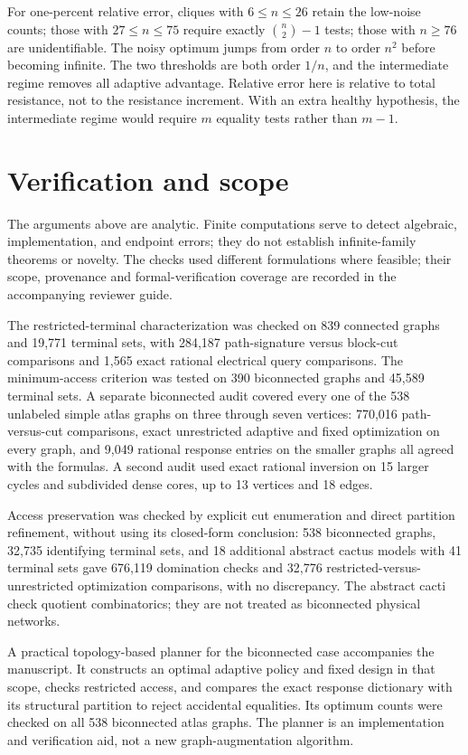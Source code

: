 \documentclass[11pt,letterpaper]{article}
\begin{document}
For one-percent relative error, cliques with $6\le n\le26$ retain the low-noise counts; those with $27\le n\le75$ require exactly $\binom n2-1$ tests; those with $n\ge76$ are unidentifiable. The noisy optimum jumps from order $n$ to order $n^2$ before becoming infinite. The two thresholds are both order $1/n$, and the intermediate regime removes all adaptive advantage. Relative error here is relative to total resistance, not to the resistance increment. With an extra healthy hypothesis, the intermediate regime would require $m$ equality tests rather than $m-1$.

\section{Verification and scope}\label{sec:verification}
The arguments above are analytic. Finite computations serve to detect algebraic, implementation, and endpoint errors; they do not establish infinite-family theorems or novelty. The checks used different formulations where feasible; their scope, provenance and formal-verification coverage are recorded in the accompanying reviewer guide.

The restricted-terminal characterization was checked on 839 connected graphs and 19,771 terminal sets, with 284,187 path-signature versus block-cut comparisons and 1,565 exact rational electrical query comparisons. The minimum-access criterion was tested on 390 biconnected graphs and 45,589 terminal sets. A separate biconnected audit covered every one of the 538 unlabeled simple atlas graphs on three through seven vertices: 770,016 path-versus-cut comparisons, exact unrestricted adaptive and fixed optimization on every graph, and 9,049 rational response entries on the smaller graphs all agreed with the formulas. A second audit used exact rational inversion on 15 larger cycles and subdivided dense cores, up to 13 vertices and 18 edges.

Access preservation was checked by explicit cut enumeration and direct partition refinement, without using its closed-form conclusion: 538 biconnected graphs, 32,735 identifying terminal sets, and 18 additional abstract cactus models with 41 terminal sets gave 676,119 domination checks and 32,776 restricted-versus-unrestricted optimization comparisons, with no discrepancy. The abstract cacti check quotient combinatorics; they are not treated as biconnected physical networks.

A practical topology-based planner for the biconnected case accompanies the manuscript. It constructs an optimal adaptive policy and fixed design in that scope, checks restricted access, and compares the exact response dictionary with its structural partition to reject accidental equalities. Its optimum counts were checked on all 538 biconnected atlas graphs. The planner is an implementation and verification aid, not a new graph-augmentation algorithm.
\end{document}
